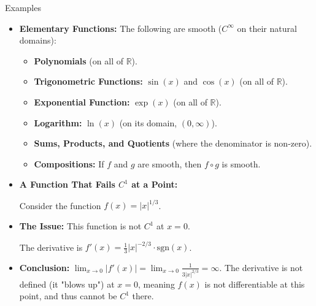 \begin{frame}{Examples}
\vspace{-0.3cm}
    \begin{itemize}
    \item \textbf{Elementary Functions:} The following are smooth ($C^\infty$ on their natural domains):
    \begin{itemize}
        \item \textbf{Polynomials} (on all of $\mathbb{R}$).
        \item \textbf{Trigonometric Functions:} $\sin(x)$ and $\cos(x)$ (on all of $\mathbb{R}$).
        \item \textbf{Exponential Function:} $\exp(x)$ (on all of $\mathbb{R}$).
        \item \textbf{Logarithm:} $\ln(x)$ (on its domain, $(0, \infty)$).
    \end{itemize}
    \begin{itemize}
        \item \textbf{Sums, Products, and Quotients} (where the denominator is non-zero).
        \item \textbf{Compositions:} If $f$ and $g$ are smooth, then $f \circ g$ is smooth.
    \end{itemize}
\end{itemize}

\begin{itemize}
    \item \textbf{A Function That Fails $C^1$ at a Point:}

    Consider the function $f(x) = |x|^{1/3}$.

    \item \textbf{The Issue:} This function is not $C^1$ at $x=0$.

    The derivative is $f'(x) = \frac{1}{3} |x|^{-2/3} \cdot \text{sgn}(x)$.
    \item \textbf{Conclusion:}
    $\lim_{x \to 0} |f'(x)| = \lim_{x \to 0} \frac{1}{3 |x|^{2/3}} = \infty.$ The derivative is not defined (it "blows up") at $x=0$, meaning $f(x)$ is not differentiable at this point, and thus cannot be $C^1$ there.
\end{itemize}
\end{frame}



